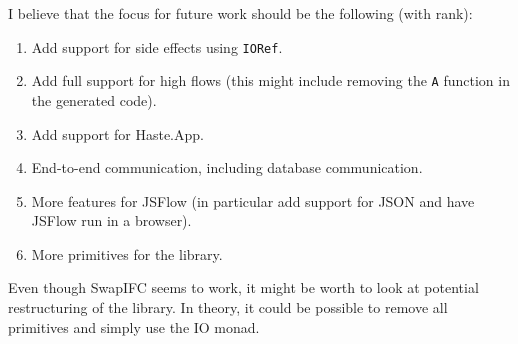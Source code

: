 I believe that the focus for future work should be the following (with rank):
\begin{enumerate}
  \item Add support for side effects using {\tt IORef}.
  \item Add full support for high flows (this might include removing the {\tt A} function in the generated code).
  \item Add support for Haste.App.
  \item End-to-end communication, including database communication.
  \item More features for JSFlow (in particular add support for JSON and have JSFlow run in a browser).
  \item More primitives for the library.
\end{enumerate}
Even though SwapIFC seems to work, it might be worth to look at potential restructuring of the library. In theory, it could be possible to remove all primitives and simply use the IO monad.
